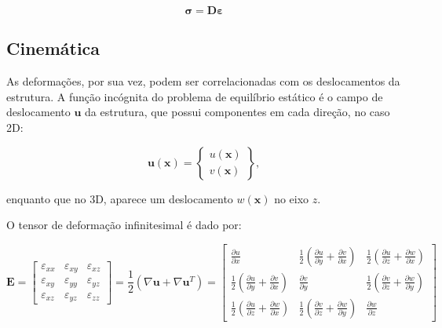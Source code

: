         \begin{equation}
            \bm{\sigma} =
            \mathbf{D}
            \bm{\varepsilon}
        \end{equation}

    \subsection{Cinemática}

        As deformações, por sua vez, podem ser correlacionadas com os deslocamentos da estrutura. A função incógnita do problema de equilíbrio estático é o campo de deslocamento $\mathbf{u}$ da estrutura, que possui componentes em cada direção, no caso 2D:

        \begin{equation}
            \mathbf{u}(\mathbf{x}) = 
            \begin{Bmatrix}
                u(\mathbf{x})\\
                v(\mathbf{x})
            \end{Bmatrix},
        \end{equation}

        \noindent enquanto que no 3D, aparece um deslocamento $w(\mathbf{x})$ no eixo $z$.

        O tensor de deformação infinitesimal é dado por:
        
        \begin{equation*}
            \mathbf{E} = 
            \begin{bmatrix}
                \varepsilon_{xx} & \varepsilon_{xy} & \varepsilon_{xz}\\
                \varepsilon_{xy} & \varepsilon_{yy} & \varepsilon_{yz}\\
                \varepsilon_{xz} & \varepsilon_{yz} & \varepsilon_{zz}
            \end{bmatrix}
            = \frac{1}{2} \left(\nabla \mathbf{u} + \nabla \mathbf{u}^T\right)=
            \begin{bmatrix}
                \frac{\partial u}{\partial x} & 
                \frac{1}{2} \left( \frac{\partial u}{\partial y} + \frac{\partial v}{\partial x} \right) & 
                \frac{1}{2} \left( \frac{\partial u}{\partial z} + \frac{\partial w}{\partial x} \right)\\
                \frac{1}{2} \left( \frac{\partial u}{\partial y} + \frac{\partial v}{\partial x} \right) & 
                \frac{\partial v}{\partial y} & 
                \frac{1}{2} \left( \frac{\partial v}{\partial z} + \frac{\partial w}{\partial y} \right)\\
                \frac{1}{2} \left( \frac{\partial u}{\partial z} + \frac{\partial w}{\partial x} \right) & 
                \frac{1}{2} \left( \frac{\partial v}{\partial z} + \frac{\partial w}{\partial y} \right) & 
                \frac{\partial w}{\partial z}
            \end{bmatrix}
            \label{eq:deformacao_green}
        \end{equation*}

